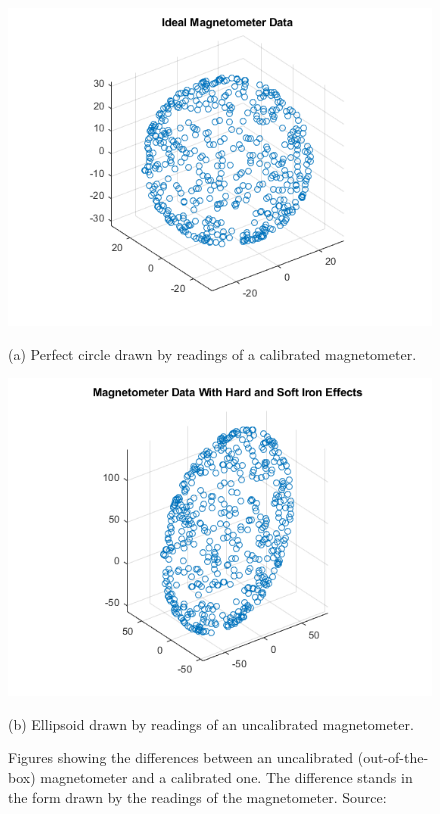 \begin{figure}[H]
	\begin{minipage}{0.48\linewidth}
		\centering
		\includegraphics[width=\textwidth]{Figures/perfectcircle.png}
		\caption*{(a) Perfect circle drawn by readings of a calibrated magnetometer.}
	\end{minipage}\hfill
	\begin{minipage}{0.48\linewidth}
		\centering
		\includegraphics[width=\textwidth]{Figures/ellipsoid.png}
		\caption*{(b) Ellipsoid drawn by readings of an uncalibrated magnetometer.}
	\end{minipage}
	\caption{Figures showing the differences between an uncalibrated (out-of-the-box) magnetometer and a calibrated one. The difference stands in the form drawn by the readings of the magnetometer. Source: \cite{magnetometermatlab}}
	\label{figure:cal_uncal_mag}
\end{figure}

